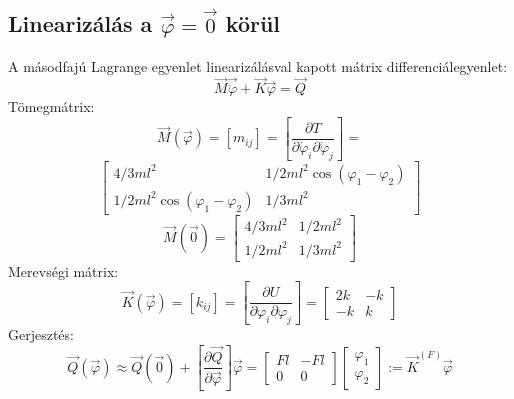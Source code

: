 \documentclass[12pt,twoside]{article}
\begin{document}
\subsection{Linearizálás a $\vec\varphi=\vec0$ körül }%
A másodfajú Lagrange egyenlet linearizálásval kapott mátrix differenciálegyenlet:
\begin{equation} \label{eq:Newton}
\vec M \vec{\ddot\varphi}+\vec K \vec{\varphi}=\vec Q
\end{equation}
Tömegmátrix:
\begin{equation} \label{eq:Newton}
\vec M(\vec\varphi)=[m_{i j}]=\left[\frac{\partial T}{\partial \dot\varphi_i  \partial \dot\varphi_j}\right]=
\end{equation}
\begin{equation} \label{eq:Newton}
\begin{bmatrix}
4/3 ml^2 & 1/2 ml^2\cos(\varphi_1-\varphi_2)\\
1/2 ml^2\cos(\varphi_1-\varphi_2) & 1/3 ml^2
\end{bmatrix}
\end{equation}
\begin{equation} \label{eq:Newton}
\vec M(\vec 0)=
\begin{bmatrix}
4/3 ml^2 & 1/2 ml^2 \\
1/2 ml^2 & 1/3 ml^2
\end{bmatrix}
\end{equation}
Merevségi mátrix:
\begin{equation} \label{eq:Newton}
\vec K(\vec\varphi)=[k_{ij}]=\left[\frac{\partial U}{\partial \varphi_i  \partial \varphi_j}\right]=
\begin{bmatrix}
2k & -k\\
-k & k
\end{bmatrix}
\end{equation}
Gerjesztés:
\begin{equation} \label{eq:Newton}
\vec Q(\vec\varphi) \approx \vec Q(\vec 0)+
\left[\frac{\partial \vec Q}{\partial \vec{\varphi}}\right]\vec{\varphi}=
\begin{bmatrix}
Fl &-Fl\\
0 & 0
\end{bmatrix} 
\begin{bmatrix}
\varphi_1\\
\varphi_2
\end{bmatrix} 
:= \vec K^{(F)} \vec \varphi
\end{equation}
\end{document}
